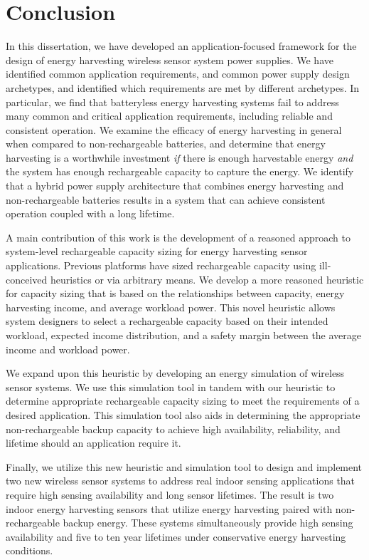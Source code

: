\chapter{Conclusion}
\label{chap:conc}

In this dissertation, we have developed an application-focused framework for the design of energy harvesting wireless sensor system power supplies.
We have identified common application requirements, and common power supply design archetypes, and identified which requirements are met by different archetypes.
In particular, we find that batteryless energy harvesting systems fail to address many common and critical application requirements, including reliable and consistent operation.
We examine the efficacy of energy harvesting in general when compared to non-rechargeable batteries, and determine that energy harvesting is a worthwhile investment \textit{if} there is enough harvestable energy \textit{and} the system has enough rechargeable capacity to capture the energy.
We identify that a hybrid power supply architecture that combines energy harvesting and non-rechargeable batteries results in a system that can achieve consistent operation coupled with a long lifetime.

A main contribution of this work is the development of a reasoned approach to system-level rechargeable capacity sizing for energy harvesting sensor applications.
Previous platforms have sized rechargeable capacity using ill-conceived heuristics or via arbitrary means.
We develop a more reasoned heuristic for capacity sizing that is based on the relationships between capacity, energy harvesting income, and average workload power.
This novel heuristic allows system designers to select a rechargeable capacity based on their intended workload, expected income distribution, and a safety margin between the average income and workload power.

We expand upon this heuristic by developing an energy simulation of wireless sensor systems.
We use this simulation tool in tandem with our heuristic to determine appropriate rechargeable capacity sizing to meet the requirements of a desired application.
This simulation tool also aids in determining the appropriate non-rechargeable backup capacity to achieve high availability, reliability, and lifetime should an application require it.

Finally, we utilize this new heuristic and simulation tool to design and implement two new wireless sensor systems to address real indoor sensing applications that require high sensing availability and long sensor lifetimes.
The result is two indoor energy harvesting sensors that utilize energy harvesting paired with non-rechargeable backup energy.
These systems simultaneously provide high sensing availability and five to ten year lifetimes under conservative energy harvesting conditions.

